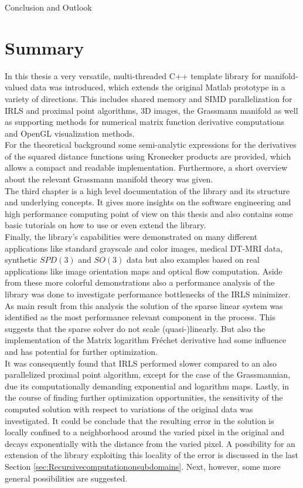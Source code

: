 \begin{chapter}{Conclusion and Outlook}
\label{ch:conclusion}

\section{Summary}
In this thesis a very versatile, multi-threaded C++ template library for manifold-valued data was introduced, which extends the original Matlab prototype in a variety of directions. This includes shared memory and SIMD parallelization for IRLS and 
proximal point algorithms, 3D images, 
the Grassmann manifold as well as supporting methods for numerical matrix function derivative computations and OpenGL visualization methods. \\

For the theoretical background some semi-analytic expressions for the derivatives of the squared
distance functions using Kronecker products are provided, which allows a compact and readable implementation.
Furthermore, a short overview about the relevant Grassmann manifold theory was given.\\

The third chapter is a high level documentation of the library and its structure and underlying concepts. It
gives more insights on the software engineering and high performance computing point of view on this thesis 
and also contains some basic tutorials on how to use or even extend the library.\\

Finally, the library's capabilities were demonstrated on many different applications like standard grayscale and color images,
medical DT-MRI data, synthetic $SPD(3)$ and $SO(3)$ data but also examples based on real applications like image orientation
maps and optical flow computation. Aside from these more colorful demonstrations also a performance analysis of the 
library was done to investigate performance bottlenecks of the IRLS minimizer. As main result from this analysis the solution 
of the sparse linear system was identified as the most performance relevant component in the process. This suggests
that the sparse solver do not scale (quasi-)linearly. But also the implementation of the Matrix logarithm Fr\'{e}chet derivative 
had some influence and has potential for further optimization.\\

It was consequently found that IRLS performed slower compared to an also parallelized proximal point algorithm, except for the case of the Grassmannian, due its computationally demanding exponential and logarithm maps. Lastly, in the course of finding further optimization opportunities, the sensitivity
of the computed solution with respect to variations of the original data  was investigated. It could be conclude that 
the resulting error in the solution is locally
confined to a neighborhood around the varied pixel in the original and decays exponentially with the distance from the varied pixel.
A possibility for an extension of the library exploiting this locality of the error is discussed in
the last Section \ref{sec:Recursivecomputationonsubdomains}. Next, however, some more general possibilities are suggested.


\end{chapter}
